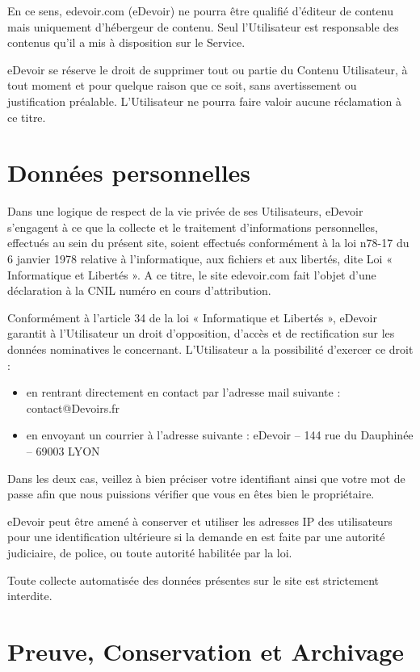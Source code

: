 En ce sens, edevoir.com (eDevoir) ne pourra être qualifié d'éditeur de contenu mais uniquement d'hébergeur de contenu. Seul l'Utilisateur est responsable des contenus qu'il a mis à disposition sur le Service.

eDevoir se réserve le droit de supprimer tout ou partie du Contenu Utilisateur, à tout moment et pour quelque raison que ce soit, sans avertissement ou justification préalable. L'Utilisateur ne pourra faire valoir aucune réclamation à ce titre. 


\section{Données personnelles}

Dans une logique de respect de la vie privée de ses Utilisateurs, eDevoir s'engagent à ce que la collecte et le traitement d'informations personnelles, effectués au sein du présent site, soient effectués conformément à la loi n78-17 du 6 janvier 1978 relative à l'informatique, aux fichiers et aux libertés, dite Loi « Informatique et Libertés ». A ce titre, le site edevoir.com fait l'objet d'une déclaration à la CNIL numéro en cours d'attribution.

Conformément à l'article 34 de la loi « Informatique et Libertés », eDevoir garantit à l'Utilisateur un droit d'opposition, d'accès et de rectification sur les données nominatives le concernant. L'Utilisateur a la possibilité d'exercer ce droit :
\begin{itemize}
   \item en rentrant directement en contact par l'adresse mail suivante : contact@Devoirs.fr
   \item en envoyant un courrier à l'adresse suivante : eDevoir -- 144 rue du Dauphinée -- 69003 LYON
\end{itemize}
 Dans les deux cas, veillez à bien préciser votre identifiant ainsi que votre mot de passe afin que nous puissions vérifier que vous en êtes bien le propriétaire.

eDevoir peut être amené à conserver et utiliser les adresses IP des utilisateurs pour une identification ultérieure si la demande en est faite par une autorité judiciaire, de police, ou toute autorité habilitée par la loi.

Toute collecte automatisée des données présentes sur le site est strictement interdite.


\section{Preuve, Conservation et Archivage}

